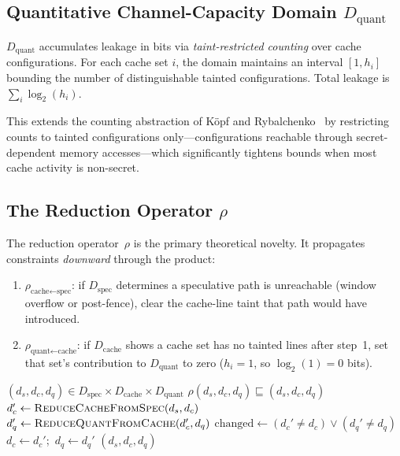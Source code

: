 \documentclass{article}
\theoremstyle{definition}
\theoremstyle{remark}
\newcommand{\Dspec}{D_{\text{spec}}}
\newcommand{\Dcache}{D_{\text{cache}}}
\newcommand{\Dquant}{D_{\text{quant}}}
\begin{document}
\subsection{Quantitative Channel-Capacity Domain $\Dquant$}
\label{sec:dquant}

$\Dquant$ accumulates leakage in bits via \emph{taint-restricted counting} over
cache configurations.  For each cache set $i$, the domain maintains an interval
$[1, h_i]$ bounding the number of distinguishable tainted configurations.  Total
leakage is $\sum_i \log_2(h_i)$.

This extends the counting abstraction of K\"opf and
Rybalchenko~\cite{kopf2010approximation} by restricting counts to tainted
configurations only---configurations reachable through secret-dependent memory
accesses---which significantly tightens bounds when most cache activity is
non-secret.

\subsection{The Reduction Operator $\rho$}
\label{sec:reduction}

The reduction operator~$\rho$ is the primary theoretical novelty.  It
propagates constraints \emph{downward} through the product:

\begin{enumerate}[nosep]
  \item $\rho_{\text{cache} \leftarrow \text{spec}}$: if $\Dspec$ determines a
    speculative path is unreachable (window overflow or post-fence), clear the
    cache-line taint that path would have introduced.
  \item $\rho_{\text{quant} \leftarrow \text{cache}}$: if $\Dcache$ shows a
    cache set has no tainted lines after step~1, set that set's contribution to
    $\Dquant$ to zero ($h_i = 1$, so $\log_2(1) = 0$ bits).
\end{enumerate}

\begin{algorithm}[t]
\caption{Reduction operator $\rho$}
\label{alg:rho}
\begin{algorithmic}[1]
\REQUIRE $(d_s, d_c, d_q) \in \Dspec \times \Dcache \times \Dquant$
\ENSURE $\rho(d_s, d_c, d_q) \sqsubseteq (d_s, d_c, d_q)$
\REPEAT
  \STATE $d_c' \leftarrow \textsc{ReduceCacheFromSpec}(d_s, d_c)$
  \STATE $d_q' \leftarrow \textsc{ReduceQuantFromCache}(d_c', d_q)$
  \STATE $\text{changed} \leftarrow (d_c' \neq d_c) \lor (d_q' \neq d_q)$
  \STATE $d_c \leftarrow d_c'$;\ $d_q \leftarrow d_q'$
\RETURN $(d_s, d_c, d_q)$
\end{algorithmic}
\end{algorithm}
\end{document}
